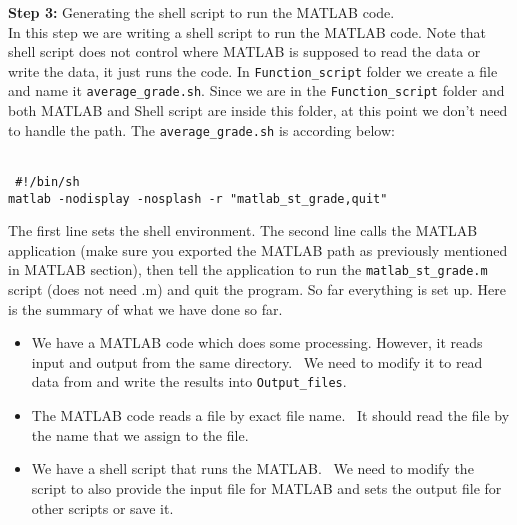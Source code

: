 
\textbf{Step 3:} Generating the shell script to run the MATLAB code. \\

\noindent
In this step we are writing a shell script to run the MATLAB code. Note that shell script does not control where MATLAB is supposed to read the data or write the data, it just runs the code. In \texttt{Function\_script} folder we create a file and name it \texttt{average\_grade.sh}. Since we are in the \texttt{Function\_script} folder and both MATLAB and Shell script are inside this folder, at this point we don't need to handle the path.  The  \texttt{average\_grade.sh} is according below:\\
 
 \begin{mdframed}[hidealllines=true,backgroundcolor=gray!20]
 \begin{singlespace}
 \fontsize{10pt}{1pt}
\texttt{
\\
\noindent
{ \color{matlab_green} \#!/bin/sh} \\
matlab -nodisplay -nosplash -r {\color{red}"matlab\_st\_grade,quit"}\\
 }
 \end{singlespace}
\end{mdframed}

\noindent
The first line sets the shell environment. The second line calls the MATLAB application (make sure you exported the MATLAB path as previously mentioned in MATLAB section), then tell the application to run  the \texttt{matlab\_st\_grade.m} script (does not need .m) and quit the program.  So far everything is set up. Here is the summary of what we have done so far. \\

\begin{itemize}

\item{We have a MATLAB code which does some processing. However, it reads input and output from the same directory. \tab \ We need to modify it to read data from and write the results into \texttt{Output\_files}.}
\item{The MATLAB code reads a file by exact file name. \tab \ It should read the file by the name that we assign to the file.}
\item{We have a shell script that runs the MATLAB. \tab \ We need to modify the script to also provide the input file for MATLAB and sets the output file for other scripts or save it.\\ \\ \\}
\end{itemize}



